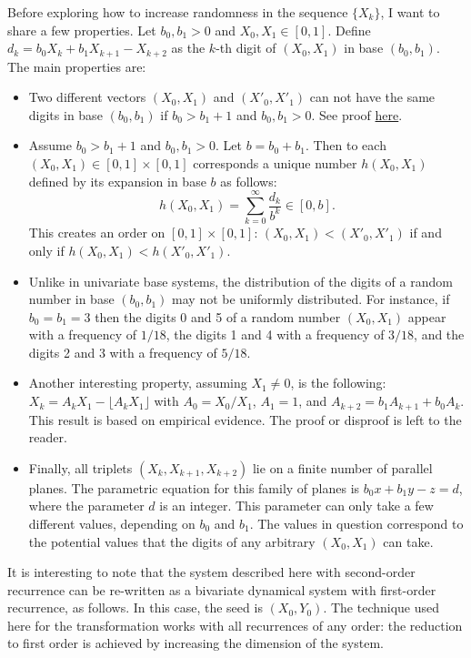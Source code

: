 \documentclass[oneside,10pt]{book}
\begin{document}
Before exploring how to increase randomness in the sequence $\{X_k\}$, I want to share a few properties. Let $b_0,b_1 >0$
and $X_0, X_1\in [0,1]$. Define $d_k = b_0 X_k + b_1 X_{k+1}-X_{k+2}$ as the $k$-th digit of $(X_0,X_1)$ in base $(b_0, b_1)$. 
The main properties are:\vspace{1ex}
\begin{itemize}
\item Two different vectors
 $(X_0, X_1)$ and $(X'_0,X'_1)$ can not have the same digits in base $(b_0,b_1)$ if $b_0>b_1 + 1$ and $b_0,b_1>0$. See 
proof \href{https://mathoverflow.net/questions/372712/hybrid-numeration-system-on-0-12}{here}.

\item Assume $b_0>b_1 + 1$ and $b_0,b_1>0$. Let $b=b_0+b_1$. Then to each $(X_0, X_1)\in [0,1]\times [0,1]$ corresponds a unique number
$h(X_0,X_1)$ defined by its expansion in base $b$ as follows:
$$
h(X_0, X_1)=\sum_{k=0}^\infty \frac{d_k}{b^k} \in [0, b].
$$
This creates an order on $[0, 1]\times [0, 1]$: $(X_0, X_1) < (X'_0,X'_1)$ if and only if
$h(X_0, X_1) < h(X'_0,X'_1)$.
\item Unlike in univariate base systems, the distribution of the digits of a random number in base $(b_0,b_1)$ may not be uniformly distributed. 
For instance, if $b_0=b_1=3$ then the digits 0 and 5 of a random number $(X_0,X_1)$ 
appear with a frequency of $1/18$, the digits 1 and 4 with a frequency of $3/18$,
 and the digits 2 and 3 with a frequency of $5/18$.

\item Another interesting property, assuming $X_1\neq 0$, is the following: $X_k = A_k X_1 - \lfloor A_k X_1\rfloor$ with $A_0=X_0/X_1$, $A_1=1$, and
$A_{k+2} = b_1 A_{k+1} + b_0 A_k$. This result is based on empirical evidence. The proof or disproof is left to the reader.

\item Finally, all triplets $(X_k, X_{k+1},X_{k+2})$ lie on a finite number of parallel planes. The parametric equation for  this family of planes is 
$b_0 x + b_1 y-z = d$, where the parameter $d$ is an integer. This parameter can only take a few different values, depending on $b_0$ and $b_1$. The values in question correspond to the potential values that the digits of any arbitrary $(X_0,X_1)$ can take.  
 \end{itemize}\vspace{1ex}

\noindent It is interesting to note that the system described here with second-order recurrence can be re-written as a 
\textcolor{index}{bivariate dynamical system} with first-order recurrence, as follows. In this case, the seed is $(X_0,Y_0)$. The technique used here for the transformation works with all recurrences of any order: the reduction to first order is achieved by increasing the dimension of the system.
\end{document}
